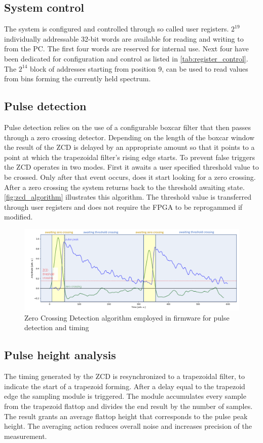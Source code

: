 \subsection{System control}

The system is configured and controlled through so called 
user registers. $2^{19}$ individually addressable 32-bit words
are available for reading and writing to from the PC. The first
four words are reserved for internal use. Next four have been 
dedicated for configuration and control as listed in \autoref{tab:register_control}.
The $2^{14}$ block of addresses starting from position 9, can
be used to read values from bins forming the currently held spectrum.

\subsection{Pulse detection}
Pulse detection relies on the use of a configurable boxcar filter
that then passes through a zero crossing detector. Depending on the
length of the boxcar window the result of the ZCD is delayed by an appropriate
amount so that it points to a point at which the trapezoidal filter's 
rising edge starts. To prevent false triggers the ZCD operates in two modes.
First it awaits a user specified threshold value to be crossed. Only after
that event occurs, does it start looking for a zero crossing.
After a zero crossing the system returns back to the threshold awaiting state.
\autoref{fig:zcd_algorithm} illustrates this algorithm. 
The threshold value is transferred through user registers and does not require
the FPGA to be reprogammed if modified.

\begin{figure}[H]
  \centering
  \includegraphics[width=\linewidth]{media/zcd_algorithm.png}
  \caption{Zero Crossing Detection algorithm employed in firmware for pulse detection and timing}
  \label{fig:zcd_algorithm} 
\end{figure}
\subsection{Pulse height analysis}
The timing generated by the ZCD is resynchronized to a trapezoidal filter, 
to indicate the start of a trapezoid forming. After a delay equal to the 
trapezoid edge the sampling module is triggered. The module
accumulates every sample from the trapezoid flattop and 
divides the end result by the number of samples.
The result grants an average flattop height that corresponds
to the pulse peak height. The averaging action reduces overall noise
and increases precision of the measurement.


